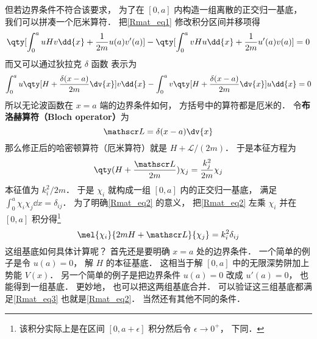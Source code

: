 但若边界条件不符合该要求， 为了在 $[0,a]$ 内构造一组离散的正交归一基底， 我们可以拼凑一个厄米算符． 把\autoref{Rmat_eq1} 修改积分区间并移项得
\begin{equation}
\qty[\int_{0}^{a} uHv\dd{x} + \frac{1}{2m}u(a)v'(a)] - \qty[\int_{0}^{a} vHu\dd{x} + \frac{1}{2m}u'(a)v(a)]
= 0
\end{equation}
而又可以通过狄拉克 $\delta$ 函数 表示为
\begin{equation}
\int_{0}^{a} u\qty[H + \frac{\delta(x-a)}{2m}\dv{x}] v\dd{x} -
\int_{0}^{a} v\qty[H + \frac{\delta(x-a)}{2m}\dv{x}] u\dd{x} = 0
\end{equation}
所以无论波函数在 $x=a$ 端的边界条件如何， 方括号中的算符都是厄米的． 令\textbf{布洛赫算符（Bloch operator）}为
\begin{equation}\label{Rmat_eq6}
\mathscr L = \delta(x-a)\dv{x}
\end{equation}
那么修正后的哈密顿算符（厄米算符）就是 $H + \mathscr L/(2m)$． 于是本征方程为
\begin{equation}\label{Rmat_eq2}
\qty(H + \frac{\mathscr L}{2m})\chi_j = \frac{k_j^2}{2m} \chi_j
\end{equation}
本征值为 ${k_i^2}/{2m}$． 于是 $\chi_i$ 就构成一组 $[0, a]$ 内的正交归一基底， 满足 $\int_0^a \chi_i \chi_j \dd{x} = \delta_{ij}$． 为了明确\autoref{Rmat_eq2} 的意义， 把\autoref{Rmat_eq2} 左乘 $\chi_i$ 并在 $[0,a]$ 积分得\footnote{该积分实际上是在区间 $[0,a+\epsilon]$ 积分然后令 $\epsilon\to 0^+$， 下同．}
\begin{equation}\label{Rmat_eq3}
\mel{\chi_i}{2mH + \mathscr L}{\chi_j} = k_i^2 \delta_{ij}
\end{equation}
这组基底如何具体计算呢？ 首先还是要明确 $x=a$ 处的边界条件． 一个简单的例子是令 $u(a) = 0$， 解 $H$ 的本征基底． 这相当于解 $[0,a]$ 中的无限深势阱加上势能 $V(x)$． 另一个简单的例子是把边界条件 $u(a) = 0$ 改成 $u'(a) = 0$， 也能得到一组基底． 更妙地， 也可以把这两组基底合并． 可以验证这三组基底都满足\autoref{Rmat_eq3} 也就是\autoref{Rmat_eq2}． 当然还有其他不同的条件．

